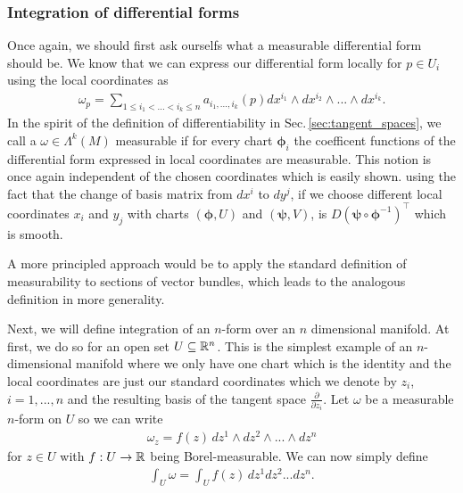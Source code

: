 \documentclass[../master_thesis.tex]{subfiles}
\begin{document}
\subsubsection{Integration of differential forms}\label{sec:integration_differential_forms_subsection}

Once again, we should first ask ourselfs what a measurable differential form 
should be. We know that we can express our differential form locally 
for $p \in U_i$ using the local coordinates as 
\begin{align*}
    \omega_p = \sum\limits_{1\leq i_1 < ... < i_k \leq n} 
        a_{i_1,...,i_k}(p) dx^{i_1} \wedge dx^{i_2} \wedge ... \wedge dx^{i_k}.
\end{align*}
In the spirit of the definition of differentiability 
in Sec.\,\ref{sec:tangent_spaces}, we call a $\omega \in \Lambda^k (M)$
measurable if for every chart $\boldsymbol{\phi}_i$ the coefficent functions of the 
differential form expressed in local coordinates 
are measurable. This notion is once again independent of the chosen 
coordinates which is easily shown. using the fact that the change of basis 
matrix from $dx^i$ to $dy^j$, if we choose different local coordinates 
$x_i$ and $y_j$ with charts $(\bm{\phi}, U)$ and $(\bm{\psi}, V)$, is 
$D(\bm{\psi} \circ \bm{\phi}^{-1})^\top$ which is smooth.

\begin{remark}
    A more principled approach would be to apply the standard definition of measurability 
    to sections of vector bundles, which leads to the analogous definition in 
    more generality.
\end{remark}

Next, we will define integration of an $n$-form over an $n$ dimensional 
manifold. At first, we do so for an open set $U \subseteq \mathbb{R}^n$.
This is the simplest example of an $n$-dimensional manifold where 
we only have one chart which is the identity and the local coordinates are 
just our standard coordinates which we denote by $z_i$, $i=1,...,n$ and the 
resulting basis of the tangent space $\frac{\partial}{\partial z_i}$. 
Let $\omega$ be a measurable 
$n$-form on $U$ so we can 
write 
\begin{align*}
    \omega_z = f(z)\, dz^1 \wedge dz^2 \wedge ... \wedge dz^n
\end{align*}
for $z \in U$ with $f:U \rightarrow \mathbb{R}$ being Borel-measurable. 
We can now simply define 
\begin{align*}
    \int_U \omega = \int_U f(z) \, dz^1 dz^2 ... dz^n.
\end{align*}
\end{document}
